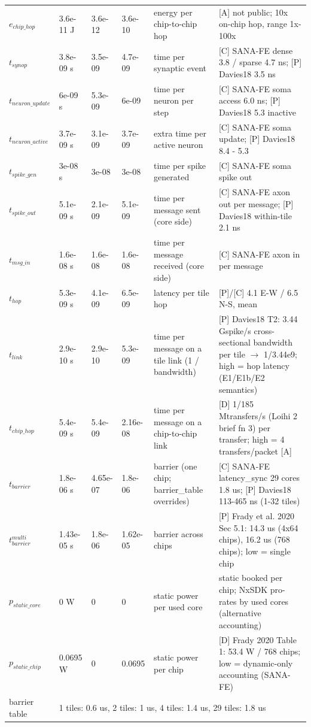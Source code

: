\begin{tabular}{@{}llllll@{}}
$e_{chip\_hop}$ & 3.6e-11 J & 3.6e-12 & 3.6e-10 & energy per chip-to-chip hop & [A] not public; 10x on-chip hop, range 1x-100x \\
$t_{synop}$ & 3.8e-09 s & 3.5e-09 & 4.7e-09 & time per synaptic event & [C] SANA-FE dense 3.8 / sparse 4.7 ns; [P] Davies18 3.5 ns \\
$t_{neuron\_update}$ & 6e-09 s & 5.3e-09 & 6e-09 & time per neuron per step & [C] SANA-FE soma access 6.0 ns; [P] Davies18 5.3 inactive \\
$t_{neuron\_active}$ & 3.7e-09 s & 3.1e-09 & 3.7e-09 & extra time per active neuron & [C] SANA-FE soma update; [P] Davies18 8.4 - 5.3 \\
$t_{spike\_gen}$ & 3e-08 s & 3e-08 & 3e-08 & time per spike generated & [C] SANA-FE soma spike out \\
$t_{spike\_out}$ & 5.1e-09 s & 2.1e-09 & 5.1e-09 & time per message sent (core side) & [C] SANA-FE axon out per message; [P] Davies18 within-tile 2.1 ns \\
$t_{msg\_in}$ & 1.6e-08 s & 1.6e-08 & 1.6e-08 & time per message received (core side) & [C] SANA-FE axon in per message \\
$t_{hop}$ & 5.3e-09 s & 4.1e-09 & 6.5e-09 & latency per tile hop & [P]/[C] 4.1 E-W / 6.5 N-S, mean \\
$t_{link}$ & 2.9e-10 s & 2.9e-10 & 5.3e-09 & time per message on a tile link (1 / bandwidth) & [P] Davies18 T2: 3.44 Gspike/s cross-sectional bandwidth per tile $\to$ 1/3.44e9; high = hop latency (E1/E1b/E2 semantics) \\
$t_{chip\_hop}$ & 5.4e-09 s & 5.4e-09 & 2.16e-08 & time per message on a chip-to-chip link & [D] 1/185 Mtransfers/s (Loihi 2 brief fn 3) per transfer; high = 4 transfers/packet [A] \\
$t_{barrier}$ & 1.8e-06 s & 4.65e-07 & 1.8e-06 & barrier (one chip; barrier\_table overrides) & [C] SANA-FE latency\_sync 29 cores 1.8 us; [P] Davies18 113-465 ns (1-32 tiles) \\
$t_{barrier}^{multi}$ & 1.43e-05 s & 1.8e-06 & 1.62e-05 & barrier across chips & [P] Frady et al. 2020 Sec 5.1: 14.3 us (4x64 chips), 16.2 us (768 chips); low = single chip \\
$p_{static\_core}$ & 0 W & 0 & 0 & static power per used core & static booked per chip; NxSDK pro-rates by used cores (alternative accounting) \\
$p_{static\_chip}$ & 0.0695 W & 0 & 0.0695 & static power per chip & [D] Frady 2020 Table 1: 53.4 W / 768 chips; low = dynamic-only accounting (SANA-FE) \\
\midrule
barrier table & \multicolumn{5}{l}{1 tiles: 0.6 us, 2 tiles: 1 us, 4 tiles: 1.4 us, 29 tiles: 1.8 us} \\
\bottomrule
\end{tabular}
